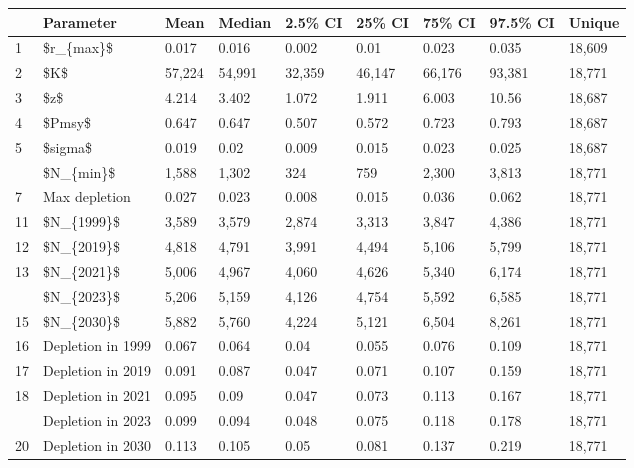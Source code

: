 \documentclass[
]{article}
\begin{document}
\begin{longtable}[t]{lllllllll}
\toprule
 & Parameter & Mean & Median & 2.5\% CI & 25\% CI & 75\% CI & 97.5\% CI & Unique\\
\midrule
1 & \$r\_\{max\}\$ & 0.017 & 0.016 & 0.002 & 0.01 & 0.023 & 0.035 & 18,609\\
2 & \$K\$ & 57,224 & 54,991 & 32,359 & 46,147 & 66,176 & 93,381 & 18,771\\
3 & \$z\$ & 4.214 & 3.402 & 1.072 & 1.911 & 6.003 & 10.56 & 18,687\\
4 & \$Pmsy\$ & 0.647 & 0.647 & 0.507 & 0.572 & 0.723 & 0.793 & 18,687\\
5 & \$sigma\$ & 0.019 & 0.02 & 0.009 & 0.015 & 0.023 & 0.025 & 18,687\\
\addlinespace
6 & \$N\_\{min\}\$ & 1,588 & 1,302 & 324 & 759 & 2,300 & 3,813 & 18,771\\
7 & Max depletion & 0.027 & 0.023 & 0.008 & 0.015 & 0.036 & 0.062 & 18,771\\
11 & \$N\_\{1999\}\$ & 3,589 & 3,579 & 2,874 & 3,313 & 3,847 & 4,386 & 18,771\\
12 & \$N\_\{2019\}\$ & 4,818 & 4,791 & 3,991 & 4,494 & 5,106 & 5,799 & 18,771\\
13 & \$N\_\{2021\}\$ & 5,006 & 4,967 & 4,060 & 4,626 & 5,340 & 6,174 & 18,771\\
\addlinespace
14 & \$N\_\{2023\}\$ & 5,206 & 5,159 & 4,126 & 4,754 & 5,592 & 6,585 & 18,771\\
15 & \$N\_\{2030\}\$ & 5,882 & 5,760 & 4,224 & 5,121 & 6,504 & 8,261 & 18,771\\
16 & Depletion in 1999 & 0.067 & 0.064 & 0.04 & 0.055 & 0.076 & 0.109 & 18,771\\
17 & Depletion in 2019 & 0.091 & 0.087 & 0.047 & 0.071 & 0.107 & 0.159 & 18,771\\
18 & Depletion in 2021 & 0.095 & 0.09 & 0.047 & 0.073 & 0.113 & 0.167 & 18,771\\
\addlinespace
19 & Depletion in 2023 & 0.099 & 0.094 & 0.048 & 0.075 & 0.118 & 0.178 & 18,771\\
20 & Depletion in 2030 & 0.113 & 0.105 & 0.05 & 0.081 & 0.137 & 0.219 & 18,771\\
\bottomrule
\end{longtable}

\newpage
\end{document}
